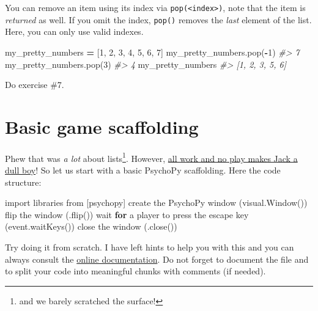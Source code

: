 \documentclass[
]{book}
\newenvironment{Shaded}{\begin{snugshade}}{\end{snugshade}}
\newcommand{\CommentTok}[1]{\textcolor[rgb]{0.56,0.35,0.01}{\textit{#1}}}
\newcommand{\ControlFlowTok}[1]{\textcolor[rgb]{0.13,0.29,0.53}{\textbf{#1}}}
\newcommand{\DecValTok}[1]{\textcolor[rgb]{0.00,0.00,0.81}{#1}}
\newcommand{\ImportTok}[1]{#1}
\newcommand{\NormalTok}[1]{#1}
\newcommand{\OperatorTok}[1]{\textcolor[rgb]{0.81,0.36,0.00}{\textbf{#1}}}
\begin{document}
You can remove an item using its index via \texttt{pop(\textless{}index\textgreater{})}, note that the item is \emph{returned} as well. If you omit the index, \texttt{pop()} removes the \emph{last} element of the list. Here, you can only use valid indexes.

\begin{Shaded}
\begin{Highlighting}[]
\NormalTok{my\_pretty\_numbers }\OperatorTok{=}\NormalTok{ [}\DecValTok{1}\NormalTok{, }\DecValTok{2}\NormalTok{, }\DecValTok{3}\NormalTok{, }\DecValTok{4}\NormalTok{, }\DecValTok{5}\NormalTok{, }\DecValTok{6}\NormalTok{, }\DecValTok{7}\NormalTok{]}
\NormalTok{my\_pretty\_numbers.pop(}\OperatorTok{{-}}\DecValTok{1}\NormalTok{)}
\CommentTok{\#\textgreater{} 7}
\NormalTok{my\_pretty\_numbers.pop(}\DecValTok{3}\NormalTok{)}
\CommentTok{\#\textgreater{} 4}
\NormalTok{my\_pretty\_numbers}
\CommentTok{\#\textgreater{} [1, 2, 3, 5, 6]}
\end{Highlighting}
\end{Shaded}

Do exercise \#7.

\hypertarget{basic-game-scaffolding}{%
\section{Basic game scaffolding}\label{basic-game-scaffolding}}

Phew that was \emph{a lot} about lists\footnote{and we barely scratched the surface!}. However, \href{https://en.wikipedia.org/wiki/All_work_and_no_play_makes_Jack_a_dull_boy}{all work and no play makes Jack a dull boy}! So let us start with a basic PsychoPy scaffolding. Here the code structure:

\begin{Shaded}
\begin{Highlighting}[]
\ImportTok{import}\NormalTok{ libraries }\ImportTok{from}\NormalTok{ [psychopy]}
\NormalTok{create the PsychoPy window (visual.Window())}
\NormalTok{flip the window (.flip())}
\NormalTok{wait }\ControlFlowTok{for}\NormalTok{ a player to press the escape key (event.waitKeys())}
\NormalTok{close the window (.close())}
\end{Highlighting}
\end{Shaded}

Try doing it from scratch. I have left hints to help you with this and you can always consult the \href{https://psychopy.org/api/index.html}{online documentation}. Do not forget to document the file and to split your code into meaningful chunks with comments (if needed).
\end{document}
